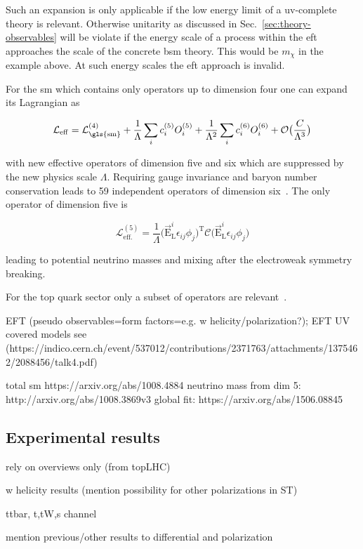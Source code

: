 Such an expansion is only applicable if the low energy limit of a \gls{uv}-complete theory is relevant. Otherwise unitarity as discussed in Sec.~\ref{sec:theory-observables} will be violate if the energy scale of a process within the \gls{eft} approaches the scale of the concrete \gls{bsm} theory. This would be $m_\chi$ in the example above. At such energy scales the \gls{eft} approach is invalid.

For the \gls{sm} which contains only operators up to dimension four one can expand its Lagrangian as

\begin{equation}
\mathcal{L}_\mathrm{eff}=\mathcal{L}_\mathrm{\gls{sm}}^\mathrm{(4)}+\frac{1}{\Lambda}\sum_{i}c_{i}^\mathrm{(5)}{O}_{i}^\mathrm{(5)}+\frac{1}{\Lambda^{2}}\sum_{i}c_{i}^\mathrm{(6)}{O}_{i}^\mathrm{(6)}+\mathcal{O}\big(\frac{C}{\Lambda^3}\big)
\end{equation}

with new effective operators of dimension five and six which are suppressed by the new physics scale $\Lambda$. Requiring gauge invariance and baryon number conservation leads to 59 independent operators of dimension six~\cite{Grzadkowski:2010es}. The only operator of dimension five is

\begin{equation}
\mathcal{L}_\mathrm{eff.}^\mathrm{(5)}=\frac{1}{\Lambda}\big(\vec{\mathrm{E}}_{\mathrm{L}}^{i}\epsilon_{ij}\phi_{j}\big)^\mathrm{T}\mathcal{C}\big(\vec{\mathrm{E}}_{\mathrm{L}}^{i}\epsilon_{ij}\phi_{j}\big)
\end{equation}

leading to potential neutrino masses and mixing after the electroweak symmetry breaking. 

For the top quark sector only a subset of operators are relevant~\cite{AguilarSaavedra:2008zc}.

EFT (pseudo observables=form factors=e.g. w helicity/polarization?); EFT UV covered models see (https://indico.cern.ch/event/537012/contributions/2371763/attachments/1375462/2088456/talk4.pdf)

total sm https://arxiv.org/abs/1008.4884
neutrino mass from dim 5: http://arxiv.org/abs/1008.3869v3
global fit: https://arxiv.org/abs/1506.08845

\subsection{Experimental results}
\label{sec:theory-exp-results}

rely on overviews only (from topLHC)

w helicity results (mention possibility for other polarizations in ST)

ttbar, t,tW,s channel

mention previous/other results to differential and polarization
